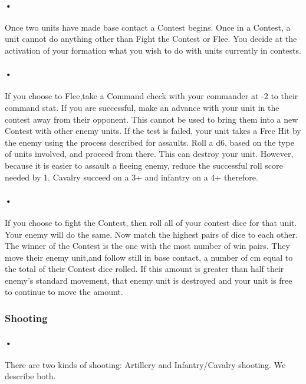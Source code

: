 \documentclass[12pt]{article}
\begin{document}
\paragraph{•}
Once two units have made base contact a Contest begins. Once in a Contest, a unit cannot do anything other than Fight the Contest or Flee. You decide at the activation of your formation what you wish to do with units currently in contests.

\paragraph{•}
If you choose to Flee,take a Command check with your commander at -2 to their command stat. If you are successful, make an advance with your unit in the contest away from their opponent. This cannot be used to bring them into a new Contest with other enemy units. If the test is failed, your unit takes a Free Hit by the enemy using the process described for assaults. Roll a d6, based on the type of units involved, and proceed from there. This can destroy your unit. However, because it is easier to assault a fleeing enemy, reduce the successful roll score needed by 1. Cavalry succeed on a 3+ and infantry on a 4+ therefore.

\paragraph{•}
If you choose to fight the Contest, then roll all of your contest dice for that unit. Your enemy will do the same. Now match the highest pairs of dice to each other. The winner of the Contest is the one with the most number of win pairs. They move their enemy unit,and follow still in base contact, a number of cm equal to the total of their Contest dice rolled. If this amount is greater than half their enemy's standard movement, that enemy unit is destroyed and your unit is free to continue to move the amount.
\subsubsection{Shooting}
\paragraph{•}
There are two kinds of shooting: Artillery and Infantry/Cavalry shooting. We describe both.
\end{document}
